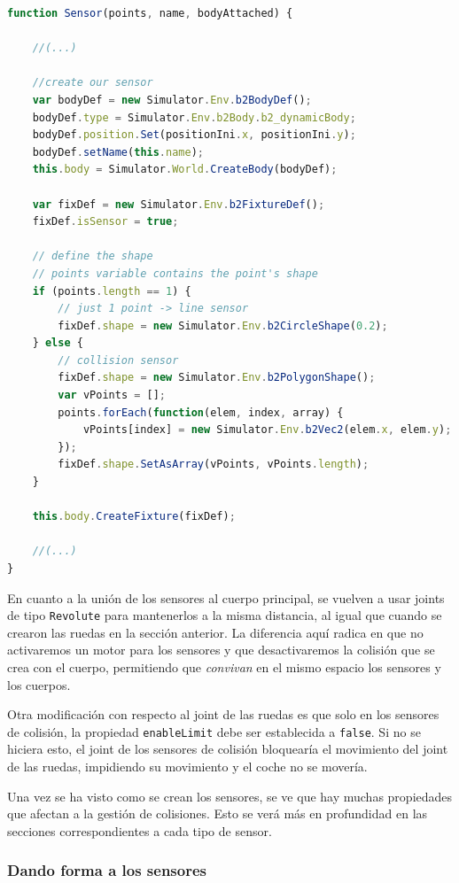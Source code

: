 \begin{lstlisting}[language={Javascript},label={code:creation-sensor}, caption={Función que construye un sensor de Robode.}]
function Sensor(points, name, bodyAttached) {

    //(...)

    //create our sensor
    var bodyDef = new Simulator.Env.b2BodyDef();
    bodyDef.type = Simulator.Env.b2Body.b2_dynamicBody;
    bodyDef.position.Set(positionIni.x, positionIni.y);
    bodyDef.setName(this.name);
    this.body = Simulator.World.CreateBody(bodyDef);

    var fixDef = new Simulator.Env.b2FixtureDef();
    fixDef.isSensor = true;

    // define the shape
    // points variable contains the point's shape
	if (points.length == 1) {
		// just 1 point -> line sensor
		fixDef.shape = new Simulator.Env.b2CircleShape(0.2);
	} else {
		// collision sensor
		fixDef.shape = new Simulator.Env.b2PolygonShape();
		var vPoints = [];
		points.forEach(function(elem, index, array) {
			vPoints[index] = new Simulator.Env.b2Vec2(elem.x, elem.y);
		});
		fixDef.shape.SetAsArray(vPoints, vPoints.length);
	}

    this.body.CreateFixture(fixDef);

    //(...)
}
\end{lstlisting}

En cuanto a la unión de los sensores al cuerpo principal, se vuelven a usar joints de tipo \texttt{Revolute} para mantenerlos a la misma distancia, al igual que cuando se crearon las ruedas en la sección anterior. La diferencia aquí radica en que no activaremos un motor para los sensores y que desactivaremos la colisión que se crea con el cuerpo, permitiendo que \emph{convivan} en el mismo espacio los sensores y los cuerpos.

Otra modificación con respecto al joint de las ruedas es que solo en los sensores de colisión, la propiedad \texttt{enableLimit} debe ser establecida a \texttt{false}. Si no se hiciera esto, el joint de los sensores de colisión bloquearía el movimiento del joint de las ruedas, impidiendo su movimiento y el coche no se movería.

Una vez se ha visto como se crean los sensores, se ve que hay muchas propiedades que afectan a la gestión de colisiones. Esto se verá más en profundidad en las secciones correspondientes a cada tipo de sensor.

\subsubsection*{Dando forma a los sensores}

